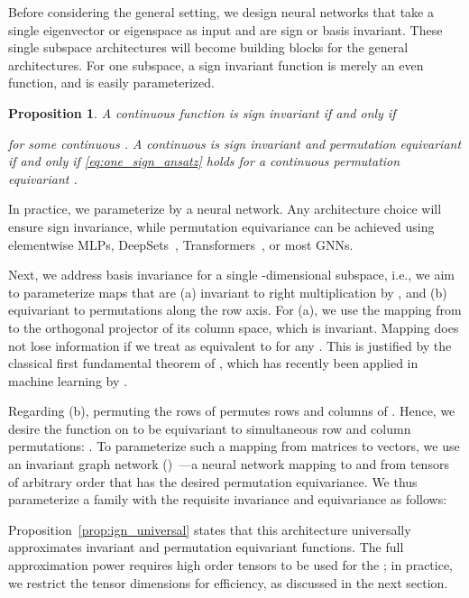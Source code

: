 \documentclass{article} \usepackage{iclr2023_conference,times}
\newtheorem{proposition}{Proposition}
\begin{document}
Before considering the general setting, we design neural networks that take a single eigenvector or eigenspace as input and are sign or basis invariant. These single subspace architectures will become building blocks for the general architectures. For one subspace, a sign invariant function is merely an even function, and is easily parameterized.
\begin{proposition}\label{prop:one_sign_invariant}
    A continuous function  is sign invariant if and only if
    
    for some continuous . A continuous  is sign invariant and permutation equivariant if and only if \eqref{eq:one_sign_ansatz} holds for a continuous permutation equivariant .
\end{proposition}

In practice, we parameterize  by a neural network. Any architecture choice will ensure sign invariance, while permutation equivariance can be achieved using elementwise MLPs, DeepSets~\citep{zaheer2017deep}, Transformers~\citep{vaswani2017attention}, or  most GNNs.

Next, we address basis invariance for a single -dimensional subspace, i.e., we aim to parameterize maps  that are (a) invariant to right multiplication by , and (b) equivariant to permutations along the row axis. For (a), we use the mapping  from  to the orthogonal projector of its column space, which is  invariant.
Mapping  does not lose information if we treat  as equivalent to  for any . This is justified by the classical first fundamental theorem of  \citep{kraft1996classical}, which has recently been applied in machine learning by \cite{villar2021scalars}.

Regarding (b), permuting the rows of  permutes rows and columns of . Hence, we desire the function   on  to be equivariant to simultaneous row and column permutations: .
To parameterize such a mapping from matrices to vectors, we use an invariant graph network ()~\citep{maron2018invariant}---a neural network mapping to and from tensors of arbitrary order  that has the desired permutation equivariance.  We thus parameterize a family with the requisite invariance and equivariance as follows:

Proposition~\ref{prop:ign_universal} states that this architecture universally approximates  invariant and permutation equivariant functions. The full approximation power requires high order tensors to be used for the ; in practice, we restrict the tensor dimensions for efficiency, as discussed in the next section.
\end{document}
